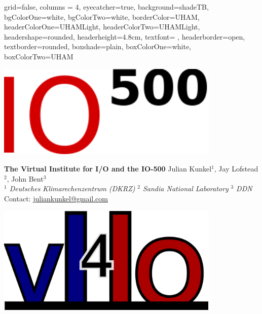 \documentclass[portrait,a0paper,fontscale=0.4]{baposter}
\begin{document}



\begin{poster}
{ %
  grid=false,
  columns = 4,
  eyecatcher=true,
  background=shadeTB,%
  bgColorOne=white,
  bgColorTwo=white,
  borderColor=UHAM,
  headerColorOne=UHAMLight,
  headerColorTwo=UHAMLight,%
  headershape=rounded,
  headerheight=4.8cm,
  textfont={\setlength{\parindent}{0em} \setlength{\parskip}{0.75em}},
  headerborder=open,
  textborder=rounded,
  boxshade=plain,%
  boxColorOne=white,
  boxColorTwo=UHAM
}{ %
  \begin{minipage}{0.2\textwidth}
   \begin{center}
    \includegraphics[width=0.8\textwidth]{logo-io500.pdf}
   \end{center}
  \end{minipage}

}{ %
  \textbf{The Virtual Institute for I/O and the IO-500}
}{ %
  \vspace{0.5em}
  \textsc
  Julian Kunkel$^1$, Jay Lofstead$^2$, John Bent$^3$
  \\[0.5em]
  \emph{$^1$ Deutsches Klimarechenzentrum (DKRZ)}
  \hspace*{2em}
  \emph{$^2$ Sandia National Laboratory}
   \hspace*{2em}
  \emph{$^3$ DDN}
  \\[0.5em]
   Contact: \url{juliankunkel@gmail.com}
}{
    \begin{minipage}{0.2\textwidth}
     \begin{center}
      \includegraphics[width=0.8\textwidth]{logo-vi4io.png}
     \end{center}
    \end{minipage}
}



\end{poster}
\end{document}
